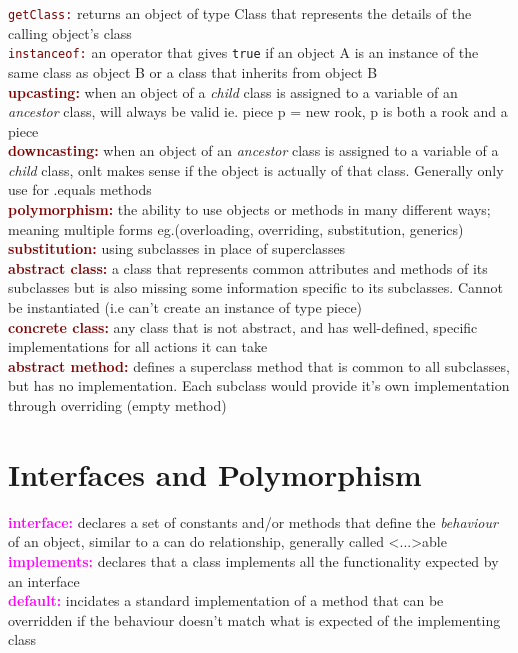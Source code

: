 \documentclass[a4paper,10pt]{article}
\begin{document}
\textcolor{Maroon}{\texttt{getClass:}} returns an object of type Class that represents the details of the calling object's class \\
\textcolor{Maroon}{\texttt{instanceof:}} an operator that gives \texttt{true} if an object A is an instance of the same class as object B or a class that inherits from object B  \\
\textcolor{Maroon}{\textbf{upcasting:}} when an object of a \emph{child} class is assigned to a variable of an \emph{ancestor} class, will always be valid ie. piece p = new rook, p is both a rook and a piece\\
\textcolor{Maroon}{\textbf{downcasting:}} when an object of an \emph{ancestor} class is assigned to a variable of a \emph{child} class, onlt makes sense if the object is actually of that class. Generally only use for .equals methods \\
\textcolor{Maroon}{\textbf{polymorphism:}} the ability to use objects or methods in many different ways; meaning multiple forms eg.(overloading, overriding, substitution, generics)  \\
\textcolor{Maroon}{\textbf{substitution:}} using subclasses in place of superclasses\\
\textcolor{Maroon}{\textbf{abstract class:}} a class that represents common attributes and methods of its subclasses but is also missing some information specific to its subclasses. Cannot be instantiated (i.e can't create an instance of type piece) \\
\textcolor{Maroon}{\textbf{concrete class:}} any class that is not abstract, and has well-defined, specific implementations for all actions it can take\\
\textcolor{Maroon}{\textbf{abstract method:}} defines a superclass method that is common to all subclasses, but has no implementation. Each subclass would provide it's own implementation through overriding (empty method)\\

\section{Interfaces and Polymorphism}
\textcolor{Magenta}{\textbf{interface:}} declares a set of constants and/or methods that define the \emph{behaviour} of an object, similar to a can do relationship, generally called <...>able \\ 
\textcolor{Magenta}{\textbf{implements:}} declares that a class implements all the functionality expected by an interface \\ 
\textcolor{Magenta}{\textbf{default:}} incidates a standard implementation of a method that can be overridden if the behaviour doesn't match what is expected of the implementing class \\ 
\end{document}
